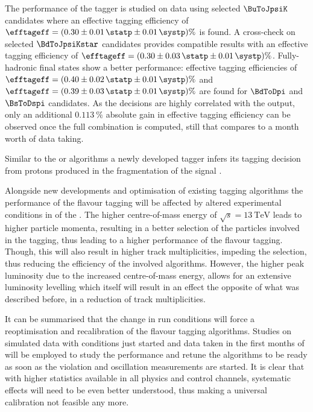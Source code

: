 The performance of the \OSc tagger is studied on data using selected
$\BuToJpsiK$ candidates where an effective tagging efficiency of $\efftageff =
(0.30 \pm 0.01\,\statp \pm 0.01\,\systp)\%$ is found. A cross-check on selected
$\BdToJpsiKstar$ candidates provides compatible results with an effective
tagging efficiency of $\efftageff = (0.30 \pm 0.03\,\statp \pm 0.01\,\systp)\%$.
Fully-hadronic final states show a better performance: effective tagging
efficiencies of $\efftageff = (0.40 \pm 0.02\,\statp \pm 0.01\,\systp)\%$ and
$\efftageff = (0.39 \pm 0.03\,\statp \pm 0.01\,\systp)\%$ are found for
$\BdToDpi$ and $\BsToDspi$ candidates. As the \OSc decisions are highly
correlated with the \OSK output, only an additional $\SI{0.113}{\percent}$
absolute gain in effective tagging efficiency can be observed once the full \OS
combination is computed, still that compares to a month worth of \RunOne data
taking.

Similar to the \SSpi or \SSK algorithms a newly developed \SSp tagger infers
its tagging decision from protons produced in the fragmentation of the signal
\Bmeson. 

Alongside new developments and optimisation of existing tagging algorithms the
performance of the flavour tagging will be affected by altered experimental
conditions in \RunTwo of the \LHC. The higher centre-of-mass energy of
$\sqrt{s}=\SI{13}{\TeV}$ leads to higher particle momenta, resulting in a better
selection of the particles involved in the tagging, thus leading to a higher
performance of the flavour tagging. Though, this will also result in higher
track multiplicities, impeding the selection, thus reducing the efficiency of
the involved algorithms. However, the higher peak luminosity due to the
increased centre-of-mass energy, allows for an extensive luminosity levelling
which itself will result in an effect the opposite of what was described before,
in a reduction of track multiplicities.

It can be summarised that the change in run conditions will force a
reoptimisation and recalibration of the flavour tagging algorithms. Studies on
\MC simulated data with \RunTwo conditions just started and data taken in the
first months of \RunTwo will be employed to study the performance and retune the
algorithms to be ready as soon as the \CP violation and \B oscillation
measurements are started. It is clear that with higher statistics available in
all physics and control channels, systematic effects will need to be even better
understood, thus making a universal calibration not feasible any more.



